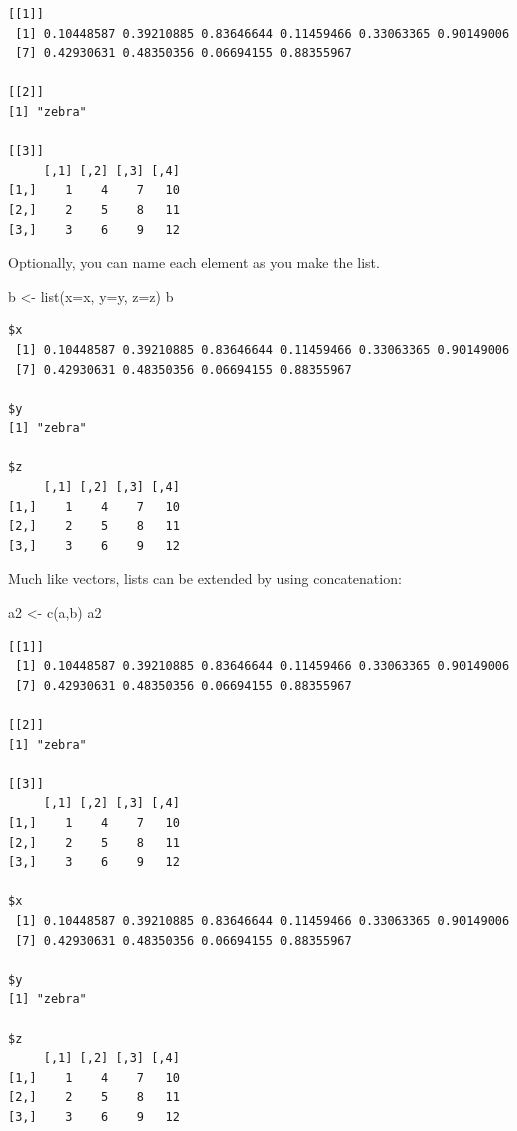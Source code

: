 \documentclass[
  13,
  letterpaper,
]{report}
\newenvironment{Shaded}{\begin{snugshade}}{\end{snugshade}}
\newcommand{\AttributeTok}[1]{\textcolor[rgb]{0.40,0.45,0.13}{#1}}
\newcommand{\FunctionTok}[1]{\textcolor[rgb]{0.28,0.35,0.67}{#1}}
\newcommand{\NormalTok}[1]{\textcolor[rgb]{0.00,0.23,0.31}{#1}}
\newcommand{\OtherTok}[1]{\textcolor[rgb]{0.00,0.23,0.31}{#1}}
\begin{document}
\begin{verbatim}
[[1]]
 [1] 0.10448587 0.39210885 0.83646644 0.11459466 0.33063365 0.90149006
 [7] 0.42930631 0.48350356 0.06694155 0.88355967

[[2]]
[1] "zebra"

[[3]]
     [,1] [,2] [,3] [,4]
[1,]    1    4    7   10
[2,]    2    5    8   11
[3,]    3    6    9   12
\end{verbatim}

Optionally, you can name each element as you make the list.

\begin{Shaded}
\begin{Highlighting}[]
\NormalTok{b }\OtherTok{\textless{}{-}} \FunctionTok{list}\NormalTok{(}\AttributeTok{x=}\NormalTok{x, }\AttributeTok{y=}\NormalTok{y, }\AttributeTok{z=}\NormalTok{z)}
\NormalTok{b}
\end{Highlighting}
\end{Shaded}

\begin{verbatim}
$x
 [1] 0.10448587 0.39210885 0.83646644 0.11459466 0.33063365 0.90149006
 [7] 0.42930631 0.48350356 0.06694155 0.88355967

$y
[1] "zebra"

$z
     [,1] [,2] [,3] [,4]
[1,]    1    4    7   10
[2,]    2    5    8   11
[3,]    3    6    9   12
\end{verbatim}

Much like vectors, lists can be extended by using concatenation:

\begin{Shaded}
\begin{Highlighting}[]
\NormalTok{a2 }\OtherTok{\textless{}{-}} \FunctionTok{c}\NormalTok{(a,b)}
\NormalTok{a2}
\end{Highlighting}
\end{Shaded}

\begin{verbatim}
[[1]]
 [1] 0.10448587 0.39210885 0.83646644 0.11459466 0.33063365 0.90149006
 [7] 0.42930631 0.48350356 0.06694155 0.88355967

[[2]]
[1] "zebra"

[[3]]
     [,1] [,2] [,3] [,4]
[1,]    1    4    7   10
[2,]    2    5    8   11
[3,]    3    6    9   12

$x
 [1] 0.10448587 0.39210885 0.83646644 0.11459466 0.33063365 0.90149006
 [7] 0.42930631 0.48350356 0.06694155 0.88355967

$y
[1] "zebra"

$z
     [,1] [,2] [,3] [,4]
[1,]    1    4    7   10
[2,]    2    5    8   11
[3,]    3    6    9   12
\end{verbatim}
\end{document}
